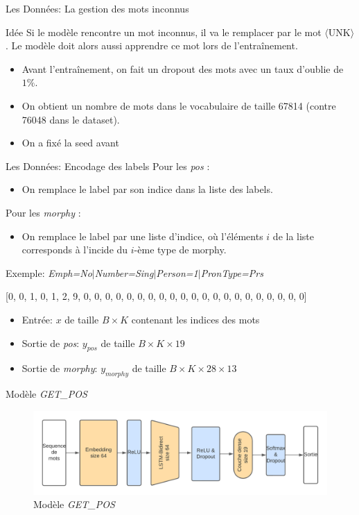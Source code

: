\documentclass[11pt]{beamer}
\begin{document}
\begin{frame}{Les Données: La gestion des mots inconnus}
    \begin{exampleblock}{Idée}
        Si le modèle rencontre un mot inconnus, il va le remplacer par le mot $\langle$UNK$\rangle$.
        Le modèle doit alors aussi apprendre ce mot lors de l'entraînement.
    \end{exampleblock}

    \begin{itemize}
        \item Avant l'entraînement, on fait un dropout des mots avec un taux d'oublie de $1\%$.
        \item On obtient un nombre de mots dans le vocabulaire de taille 67814 (contre 76048 dans le dataset).
        \item On a fixé la seed avant
    \end{itemize}
\end{frame}

\begin{frame}{Les Données: Encodage des labels}
    Pour les \textit{pos} :
    \begin{itemize}
        \item On remplace le label par son indice dans la liste des labels.
    \end{itemize}
    Pour les \textit{morphy} :
    \begin{itemize}
        \item On remplace le label par une liste d'indice, où l'éléments $i$ de la liste corresponds à l'incide du $i$-ème type de morphy.
    \end{itemize}
    Exemple: \textit{Emph=No$\mid$Number=Sing$\mid$Person=1$\mid$PronType=Prs}

    [0, 0, 1, 0, 1, 2, 9, 0, 0, 0, 0, 0, 0, 0, 0, 0, 0, 0, 0, 0, 0, 0, 0, 0, 0, 0, 0, 0]

    \begin{itemize}
        \item Entrée: $x$ de taille $B \times K$ contenant les indices des mots
        \item Sortie de \textit{pos}: $y_{pos}$ de taille $B \times K \times 19$
        \item Sortie de \textit{morphy}: $y_{morphy}$ de taille $B \times K \times 28 \times 13$
    \end{itemize}
\end{frame}

\begin{frame}{Modèle \textit{GET\_POS}}
    \begin{figure}
        \centering
        \includegraphics[width=\textwidth]{get_pos.png}
        \caption{Modèle \textit{GET\_POS}}
        \label{fig: model getpos}
    \end{figure} 
\end{frame}
\end{document}

